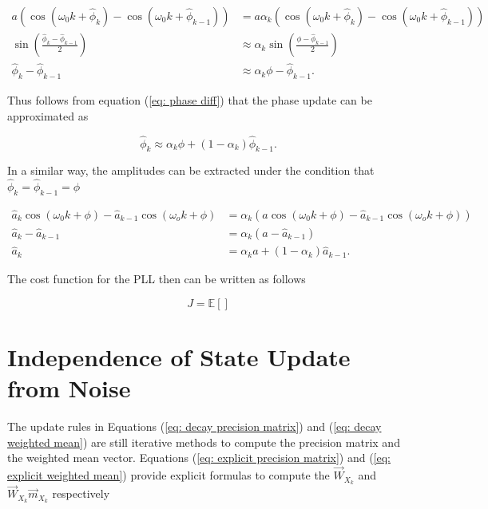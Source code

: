 \documentclass[11pt,a4paper,twoside]{report}
\newcommand{\messF}[3]{\overrightarrow{#1}_{{#2}_{k{#3}}}}
\begin{document}
\begin{align}
	a\left(\cos{\left(\omega_0k + \hat{\phi}_k\right)}- \cos{\left(\omega_0k + \hat{\phi}_{k-1}\right)}\right) &= 
	a\alpha_k\left(\cos{\left(\omega_0k + \hat{\phi}_k\right)}- \cos{\left(\omega_0k + \hat{\phi}_{k-1}\right)}\right) \\
	\sin{\left(\frac{\hat{\phi}_k - \hat{\phi}_{k-1}}{2}\right)} &\approx \alpha_k\sin{\left(\frac{\phi - \hat{\phi}_{k-1}}{2}\right)} \\
	\label{eq: phase diff}
	\hat{\phi}_k - \hat{\phi}_{k-1} &\approx \alpha_k\phi - \hat{\phi}_{k-1}.
\end{align}

Thus follows from equation (\ref{eq: phase diff}) that the phase update can be approximated as

\begin{equation}
	\hat{\phi}_k \approx \alpha_k\phi + \left(1-\alpha_k\right)\hat{\phi}_{k-1}.
\end{equation}


In a similar way, the amplitudes can be extracted under the condition that $\hat{\phi}_k = \hat{\phi}_{k-1} = \phi$

\begin{align}
	\hat{a}_k\cos{\left(\omega_0k + \phi\right)} - \hat{a}_{k-1}\cos{\left(\omega_ok + \phi\right)} &= \alpha_k\left(a\cos{\left(\omega_0k + \phi\right)} - \hat{a}_{k-1}\cos{\left(\omega_ok + \phi\right)}\right) \\
	\hat{a}_k - \hat{a}_{k-1} &= \alpha_k\left(a-\hat{a}_{k-1}\right) \\
	\hat{a}_k &= \alpha_ka + \left(1-\alpha_k\right)\hat{a}_{k-1}.
\end{align}

The cost function for the PLL then can be written as follows

\begin{equation}
	J = \mathbb{E}\left[\right]
\end{equation}




\chapter*{Independence of State Update from Noise}

The update rules in Equations (\ref{eq: decay precision matrix}) and (\ref{eq: decay weighted mean}) are still iterative methods to compute the precision matrix and the weighted mean vector. Equations (\ref{eq: explicit precision matrix}) and (\ref{eq: explicit weighted mean}) provide explicit formulas to compute the $\messF{W}{X}{}$ and $\messF{W}{X}{}\messF{m}{X}{}$ respectively
\end{document}

